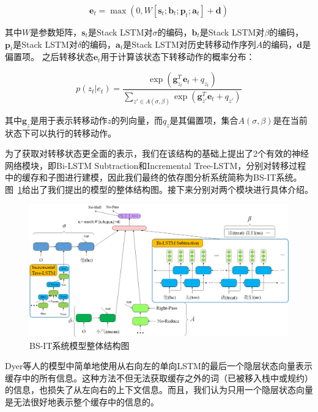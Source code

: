 \vspace{-0.6em}
\begin{equation}
	\label{eq:trans}
	\mathbf{e}_t=\max(0,W[\mathbf{s}_t;\mathbf{b}_t; \mathbf{p}_t; \mathbf{a}_t ]+\mathbf{d})
\end{equation}

其中$W$是参数矩阵，$\mathbf{s}_t$是Stack LSTM对$\sigma$的编码，$\mathbf{b}_t$是Stack LSTM对$\beta$的编码， $\mathbf{p}_t$是Stack LSTM对$\delta$的编码，$\mathbf{a}_t$是Stack LSTM对历史转移动作序列$A$的编码，$\mathbf{d}$是偏置项。
之后转移状态$\mathbf{e}_t$用于计算该状态下转移动作的概率分布：

\vspace{-0.6em}
\begin{equation}
	\label{eq:trans-softmax}
	p(z_t|e_t)=\frac{\exp(\mathbf{g}^T_{z_t}\mathbf{e}_t + q_{z_t})}{\sum_{z'\in A(\sigma, \beta)}\exp (\mathbf{g}^T_{z'}\mathbf{e}_t+q_{z'})}
\end{equation}

其中$\mathbf{g}_z$是用于表示转移动作$z$的列向量，而$q_z$是其偏置项，集合$A(\sigma,\beta)$是在当前状态下可以执行的转移动作。

为了获取对转移状态更全面的表示，我们在该结构的基础上提出了2个有效的神经网络模块，即Bi-LSTM Subtraction和Incremental Tree-LSTM，分别对转移过程中的缓存和子图进行建模，因此我们最终的依存图分析系统简称为BS-IT系统。图~\ref{fig:bsit}给出了我们提出的模型的整体结构图。接下来分别对两个模块进行具体介绍。

\begin{figure}[hbtp]
	\centering
	\includegraphics[width=130mm]{figures/bs-it.jpg}
	\caption{BS-IT系统模型整体结构图}
	\label{fig:bsit}
\end{figure}

Dyer等人的模型中简单地使用从右向左的单向LSTM的最后一个隐层状态向量表示缓存中的所有信息。这种方法不但无法获取缓存之外的词（已被移入栈中或规约）的信息，也损失了从左向右的上下文信息。而且，我们认为只用一个隐层状态向量是无法很好地表示整个缓存中的信息的。

